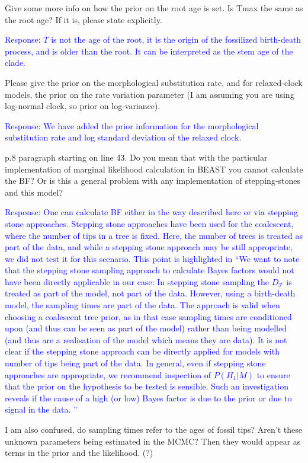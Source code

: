 \documentclass[11pt]{article}
\newcommand{\response}[1]{\medskip{}\textcolor{blue}{{Response: #1}}\medskip{}}
\begin{document}
Give some more info on how the prior on the root age is set. Is Tmax the same as the root age? If it is, please state explicitly.

\response{$T$ is not the age of the root, it is the origin of the fossilized birth-death process, and is older than the root. It can be interpreted as the stem age of the clade.}

Please give the prior on the morphological substitution rate, and for relaxed-clock models, the prior on the rate variation parameter (I am assuming you are using log-normal clock, so prior on log-variance).

\response{We have added the prior information for the morphological substitution rate and log standard deviation of the relaxed clock.}

p.8 paragraph starting on line 43. Do you mean that with the particular implementation of marginal likelihood calculation in BEAST you cannot calculate the BF? Or is this a general problem with any implementation of stepping-stones and this model? 

\response{One can calculate BF either in the way described here or via stepping stone approaches. Stepping stone approaches have been used for the coalescent, where the number of tips in a tree is fixed. Here, the number of trees is treated as part of the data, and while a stepping stone approach may be still appropriate, we did not test it for this scenario. This point is highlighted in ``We want to note that the stepping stone sampling approach \cite{Xie2011}
 to calculate Bayes factors would not have been directly applicable in our case:  In stepping stone sampling the $D_\mathcal{T}$ is treated as part of the model, not part of the data. However, using a birth-death model, the sampling times are part of the data. The approach is valid when choosing a  coalescent tree prior, as in that case sampling times are conditioned upon (and thus can be seen as part of the model) rather than being modelled (and thus are a realisation of the model which means they are data). It is not clear if the stepping stone approach can be directly applied for models with number of tips being part of the data.
In general, even if stepping stone approaches are appropriate, we recommend inspection of $P(H_1|M)$ to ensure that the prior on the hypothesis to be tested is sensible. Such an investigation reveals if the cause of a high (or low) Bayes factor is due to the prior or due to signal in the data.
'' }

I am also confused, do sampling times refer to the ages of fossil tips? Aren't these unknown parameters being estimated in the MCMC? Then they would appear as terms in the prior and the likelihood. (?)
\end{document}
